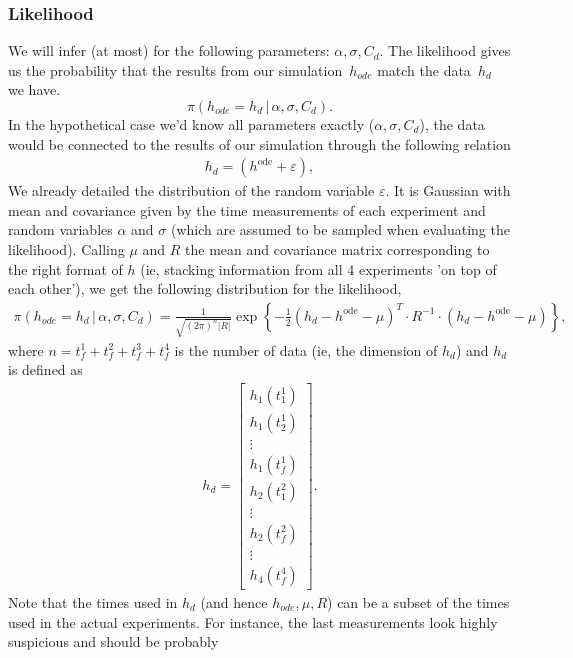\documentclass{article}
\begin{document}
\subsubsection*{Likelihood}

We will infer (at most) for the following parameters: $\alpha,\sigma,C_{d}$.
The likelihood gives us the probability that the results from our
simulation~$h_{ode}$ match the data~$h_{d}$ we have.
\[
\pi\left(h_{ode}=h_{d}\,|\,\alpha,\sigma,C_{d}\right).
\]
 In the hypothetical case we'd know all parameters exactly ($\alpha,\sigma,C_{d}$),
the data would be connected to the results of our simulation through
the following relation
\begin{align*}
h_{d}=\left(h^{\text{ode}}+\varepsilon\right),
\end{align*}
We already detailed the distribution of the random variable $\varepsilon$.
It is Gaussian with mean and covariance given by the time measurements
of each experiment and random variables $\alpha$ and $\sigma$ (which
are assumed to be sampled when evaluating the likelihood). Calling
$\mu$ and $R$ the mean and covariance matrix corresponding to the
right format of $h$ (ie, stacking information from all 4 experiments
'on top of each other'), we get the following distribution for the
likelihood,
\begin{align*}
\pi(h_{ode}=h_{d}\,|\,\alpha,\sigma,C_{d})=\frac{1}{\sqrt{(2\pi)^{n}|R|}}\exp\left\{ -\frac{1}{2}\left(h_{d}-h^{\text{ode}}-\mu\right)^{T}\cdotp R^{-1}\cdotp\left(h_{d}-h^{\text{ode}}-\mu\right)\right\} ,
\end{align*}
 where $n=t_{f}^{1}+t_{f}^{2}+t_{f}^{3}+t_{f}^{4}$ is the number
of data (ie, the dimension of $h_{d}$) and $h_{d}$ is defined as
\begin{align*}
h_{d}=\begin{bmatrix}h_{1}(t_{1}^{1})\\
h_{1}(t_{2}^{1})\\
\vdots\\
h_{1}(t_{f}^{1})\\
h_{2}(t_{1}^{2})\\
\vdots\\
h_{2}(t_{f}^{2})\\
\vdots\\
h_{4}(t_{f}^{4})
\end{bmatrix}.
\end{align*}
 Note that the times used in $h_{d}$ (and hence $h_{ode},\mu,R$)
can be a subset of the times used in the actual experiments. For instance,
the last measurements look highly suspicious and should be probably
\end{document}
